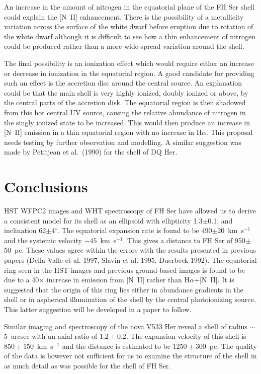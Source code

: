 An increase in the amount of nitrogen in the equatorial plane of the FH
Ser shell could explain the [N~II] enhancement. There is the possibility of a
metallicity variation across the surface of the white dwarf before
eruption due to rotation of the white dwarf 
although it is difficult to see how a
thin enhancement of nitrogen could be produced rather than a more wide-spread 
variation around the shell.

The final possibility is an ionization effect which would require either
an increase or decrease in ionization in the equatorial region. A good
candidate for providing such an effect is the accretion disc around the
central source. An explanation could be that the main shell is very
highly ionized, doubly ionized or above, by the central parts of the
accretion disk. The equatorial region is then shadowed from this hot
central UV source, causing the relative abundance of 
nitrogen in the singly ionized state to be increased. 
This would then produce an
increase in [N~II] emission in a thin equatorial region with no increase
in H$\alpha$. This proposal needs testing by further observation and 
modelling. A similar suggestion was made by Petitjean et al.\ (1990) for 
the shell of DQ Her. 


\section{Conclusions}
\label{conc}
HST WFPC2 images and WHT spectroscopy of FH Ser have allowed us to
derive a consistent model for its shell as an ellipsoid with
ellipticity 1.3$\pm$0.1, and inclination 62$\pm$4$^\circ$. The
equatorial expansion rate is found to be 490$\pm$20~km~s$^{-1}$ and
the systemic velocity $-45$~km~s$^{-1}$. This gives a distance to FH
Ser of 950$\pm$50~pc. These values agree within the
errors with the results presented in previous papers (Della Valle et
al.  1997, Slavin et al. 1995, Duerbeck 1992).  The equatorial ring
seen in the HST images and previous ground-based images is found to be
due to a 40$\times$ increase in emission from [N~II] rather than
H$\alpha$+[N~II]. It is suggested that the origin of this ring lies
either in abundance gradients in the shell or in aspherical
illumination of the shell by the central photoionizing source. This
latter suggestion will be developed in a paper to follow.

Similar imaging and spectroscopy of the nova V533 Her reveal a shell of 
radius $\sim$5~arcsec with an axial ratio of $1.2\pm0.2$. The expansion
velocity of this shell is $850\pm150$~km~s$^{-1}$ and the distance is estimated
to be $1250\pm300$~pc. The quality of the data is however not sufficient for 
us to examine the structure of the shell in as much detail as was possible 
for the shell of FH Ser.  

